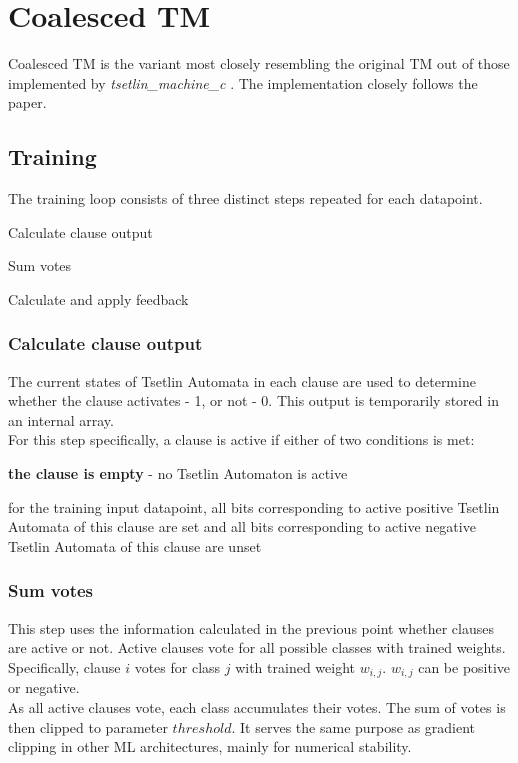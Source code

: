 \documentclass[english]{aghengthesis} %
\newcommand*{\LibraryName}{\emph{tsetlin\_machine\_c }}
\begin{document}
\section{Coalesced TM}
Coalesced TM is the variant most closely resembling the original TM out of those implemented by \LibraryName. The implementation closely follows the paper.~\cite{glimsdal2021coalescedmultioutputtsetlinmachines}

\subsection{Training}
The training loop consists of three distinct steps repeated for each datapoint.
\begin{compactenum}
    \item Calculate clause output
    \item Sum votes
    \item Calculate and apply feedback
\end{compactenum}

\subsubsection{Calculate clause output}
The current states of Tsetlin Automata in each clause are used to determine whether the clause activates - 1, or not - 0. This output is temporarily stored in an internal array. \\
For this step specifically, a clause is active if either of two conditions is met:
\begin{compactitem}
    \item \textbf{the clause is empty} - no Tsetlin Automaton is active
    \item for the training input datapoint, all bits corresponding to active positive Tsetlin Automata of this clause are set and all bits corresponding to active negative Tsetlin Automata of this clause are unset
\end{compactitem}

\subsubsection{Sum votes}
This step uses the information calculated in the previous point whether clauses are active or not. Active clauses vote for all possible classes with trained weights. Specifically, clause $i$ votes for class $j$ with trained weight $w_{i,j}$. $w_{i,j}$ can be positive or negative.\\
As all active clauses vote, each class accumulates their votes. The sum of votes is then clipped to parameter $threshold$. It serves the same purpose as gradient clipping in other ML architectures, mainly for numerical stability. %
\end{document}

